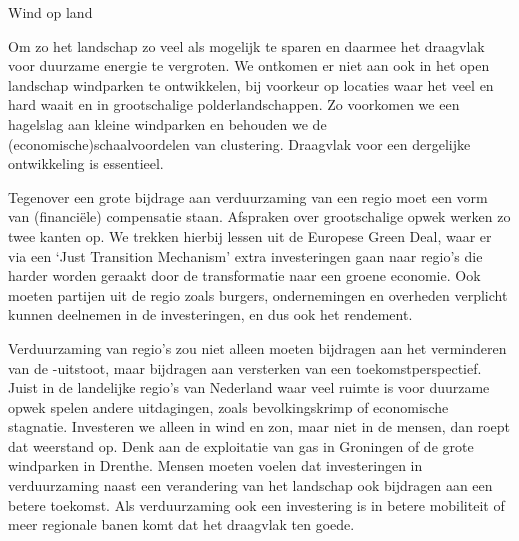 \begin{voorstel}{Wind op land}
\begin{multicols}{2}
\begin{aanbevelingen-start}
Om zo het landschap zo veel als mogelijk te sparen en daarmee het draagvlak voor duurzame energie te vergroten. We ontkomen er niet aan ook in het open landschap windparken te ontwikkelen, bij voorkeur op locaties waar het veel en hard waait en in grootschalige polderlandschappen. Zo voorkomen we een hagelslag aan kleine windparken en behouden we de (economische)schaalvoordelen van clustering. Draagvlak voor een dergelijke ontwikkeling is essentieel.

Tegenover een grote bijdrage aan verduurzaming van een regio moet een vorm van (financiële) compensatie staan. Afspraken over grootschalige opwek werken zo twee kanten op. We trekken hierbij lessen uit de Europese Green Deal, waar er via een ‘Just Transition Mechanism’ extra investeringen gaan naar regio’s die harder worden geraakt door de transformatie naar een groene economie. Ook moeten partijen uit de regio zoals burgers, ondernemingen en overheden verplicht kunnen deelnemen in de investeringen, en dus ook het rendement.
\end{aanbevelingen-start}

\begin{aanbevelingen-end}
Verduurzaming van regio’s zou niet alleen moeten bijdragen aan het verminderen van de \COO-uitstoot, maar bijdragen aan versterken van een toekomstperspectief. Juist in de landelijke regio’s van Nederland waar veel ruimte is voor duurzame opwek spelen andere uitdagingen, zoals bevolkingskrimp of economische stagnatie. Investeren we alleen in wind en zon, maar niet in de mensen, dan roept dat weerstand op. Denk aan de exploitatie van gas in Groningen of de grote windparken in Drenthe. Mensen moeten voelen dat investeringen in verduurzaming naast een verandering van het landschap ook bijdragen aan een betere toekomst. Als verduurzaming ook een investering is in betere mobiliteit of meer regionale banen komt dat het draagvlak ten goede.

\end{aanbevelingen-end}

\end{multicols}

\end{voorstel}
